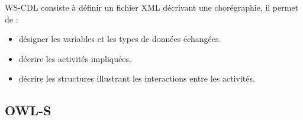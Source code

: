     \textsc{WS-CDL} consiste à définir un fichier XML décrivant une
    chorégraphie, il permet de \cite{elie2010}:
    \begin{itemize} %
    \item désigner les variables et les types de données échangées.
    \item décrire les  activités impliquées.
    \item décrire les structures illustrant les interactions entre
      les activités.
    \end{itemize}





    \newpage
    \subsection{OWL-S}
    \label{sec:owl-s}
    \cite{mcilraith2003bringing}
    
    

